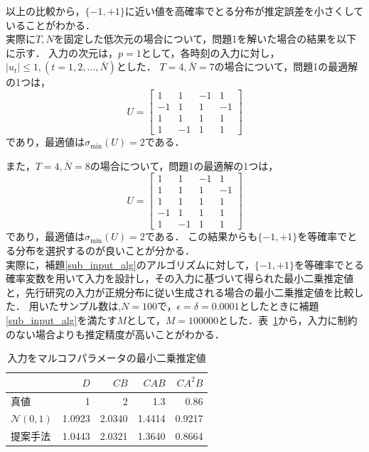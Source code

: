 以上の比較から，$\{-1, +1\}$に近い値を高確率でとる分布が推定誤差を小さくしていることがわかる．
\\
実際に$T, N$を固定した低次元の場合について，問題1を解いた場合の結果を以下に示す．
入力の次元は，$p=1$として，各時刻の入力に対し，$|u_t| \leq 1,  (t = 1, 2, \ldots , \bar{N})$とした．
$T = 4, \bar{N} = 7$の場合について，問題1の最適解の1つは，
\begin{equation*}
    U = 
    \begin{bmatrix}
    1 & 1 & -1 & 1 \\
    -1 & 1 & 1 & -1 \\
    1 & 1 & 1 & 1 \\
    1 & -1 & 1 & 1
    \end{bmatrix}
\end{equation*}
であり，最適値は$\sigma_{\text{min}}(U) = 2$である．

また，$T = 4, \bar{N} = 8$の場合について，問題1の最適解の1つは，
\begin{equation*}
    U = 
    \begin{bmatrix}
    1 & 1 & -1 & 1  \\
    1 & 1 & 1 & -1 \\
    1 & 1 & 1 & 1  \\
    -1 & 1 & 1 & 1 \\
    1 & -1 & 1 & 1
    \end{bmatrix}
\end{equation*}
であり，最適値は$\sigma_{\text{min}}(U) = 2$である．
この結果からも$\{-1, +1\}$を等確率でとる分布を選択するのが良いことが分かる．\\

実際に，補題\ref{sub_input_alg}のアルゴリズムに対して，$\{-1, +1\}$を等確率でとる確率変数を用いて入力を設計し，その入力に基づいて得られた最小二乗推定値と，先行研究の入力が正規分布に従い生成される場合の最小二乗推定値を比較した．
用いたサンプル数は,$N = 100$で，$\epsilon = \delta = 0.0001$としたときに補題\ref{sub_input_alg}を満たす$M$として，$M = 100000$とした．表~\ref{table_1}から，入力に制約のない場合よりも推定精度が高いことがわかる．

\begin{table}[h!]
\caption{入力をマルコフパラメータの最小二乗推定値}
\centering
\begin{tabular}{l|rrrr}
                    & $D$      & $CB$     & $CAB$  & $CA^2B$     \\ \hline \hline 
真値                 & 1      & 2      & 1.3 & 0.86 \\ \hline
$\mathcal{N}(0, 1)$ & 1.0923 & 2.0340 & 1.4414  & 0.9217 \\ \hline
提案手法              & 1.0443 & 2.0321 & 1.3640  & 0.8664                   
\end{tabular}
\label{table_1}
\end{table}

